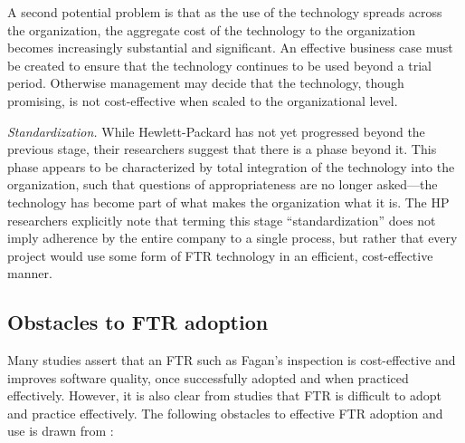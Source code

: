\begin{itemizenoindent}
  A second potential problem is that as the use of the technology spreads
  across the organization, the aggregate cost of the technology to the
  organization becomes increasingly substantial and significant. An
  effective business case must be created to ensure that the technology
  continues to be used beyond a trial period. Otherwise management may
  decide that the technology, though promising, is not cost-effective
  when scaled to the organizational level.

\item {\em Standardization.}  While Hewlett-Packard has not yet progressed beyond the
  previous stage, their researchers suggest that there is a phase beyond
  it.  This phase appears to be characterized by total integration of the
  technology into the organization, such that questions of
  appropriateness are no longer asked---the technology has become part of
  what makes the organization what it is. The HP researchers explicitly
  note that terming this stage ``standardization'' does not imply
  adherence by the entire company to a single process, but rather that
  every project would use some form of FTR technology in an efficient,
  cost-effective manner.

\end{itemizenoindent}

\subsection{Obstacles to FTR adoption}

Many studies assert that an FTR such as Fagan's inspection is
cost-effective and improves software quality, once successfully adopted and
when practiced effectively. However, it is also clear from studies that FTR
is difficult to adopt and practice effectively.  The following obstacles to
effective FTR adoption and use is drawn from
\cite{Basili94,Brykczynski94,Russell91}:

